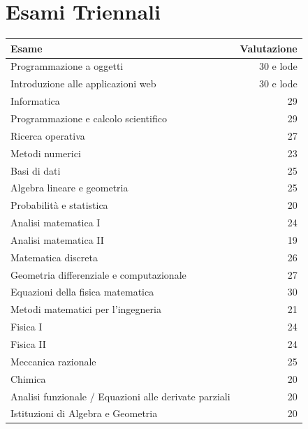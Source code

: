 \documentclass[12pt]{extarticle}
\begin{document}
\section{Esami Triennali}

\begin{center}
\begin{tabular}{p{11cm} r}

\toprule
\textbf{Esame} & \textbf{Valutazione} \\
\midrule

Programmazione a oggetti & 30 e lode \\
Introduzione alle applicazioni web & 30 e lode \\
Informatica & 29 \\
Programmazione e calcolo scientifico & 29 \\
Ricerca operativa & 27 \\
Metodi numerici & 23 \\
Basi di dati & 25 \\
Algebra lineare e geometria & 25 \\
Probabilità e statistica & 20 \\
Analisi matematica I & 24 \\
Analisi matematica II & 19 \\
Matematica discreta & 26 \\
Geometria differenziale e computazionale & 27 \\
Equazioni della fisica matematica & 30 \\
Metodi matematici per l'ingegneria & 21 \\
Fisica I & 24 \\
Fisica II & 24 \\
Meccanica razionale & 25 \\
Chimica & 20 \\
Analisi funzionale / Equazioni alle derivate parziali & 20 \\
Istituzioni di Algebra e Geometria & 20 \\

\bottomrule
\end{tabular}
\end{center}
\end{document}
